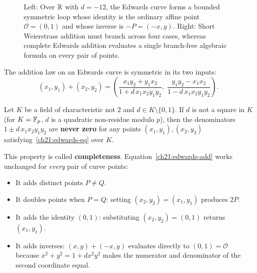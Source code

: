 \begin{figure}[htbp]
\caption{Left: Over $\mathbb{R}$ with $d=-12$, the Edwards curve forms a bounded symmetric loop
whose identity is the ordinary affine point $\mathcal{O}=(0,1)$ and whose inverse is
$-P=(-x,y)$. Right: Short Weierstrass addition must branch across four cases, whereas
complete Edwards addition evaluates a single branch-free algebraic formula on every pair
of points.}
\label{ch21:edwards-fig}
\end{figure}

The addition law on an Edwards curve is symmetric in its two inputs:
\begin{equation}
\label{ch21:edwards-add}
(x_1, y_1) + (x_2, y_2) = \left( \frac{x_1 y_2 + y_1 x_2}{1 + d\,x_1 x_2 y_1 y_2}, \;
\frac{y_1 y_2 - x_1 x_2}{1 - d\,x_1 x_2 y_1 y_2} \right).
\end{equation}

\begin{theorem}
\label{ch21:thm-edwards-complete}
 Let $K$ be a field of characteristic not $2$ and $d \in K \setminus \{0,1\}$. If $d$ is
not a square in $K$ (for $K = \mathbb{F}_p$, $d$ is a quadratic non-residue modulo $p$), then the
denominators $1 \pm d\,x_1 x_2 y_1 y_2$ are \textbf{never zero} for any points
$(x_1, y_1), (x_2, y_2)$ satisfying~\eqref{ch21:edwards-eq} over $K$.
\end{theorem}

This property is called \textbf{completeness}. Equation~\eqref{ch21:edwards-add} works
unchanged for \emph{every} pair of curve points:
\begin{itemize}
  \item It adds distinct points $P \neq Q$.
  \item It doubles points when $P = Q$: setting $(x_2, y_2) = (x_1, y_1)$ produces $2P$.
  \item It adds the identity $(0, 1)$: substituting $(x_2, y_2) = (0, 1)$ returns $(x_1, y_1)$.
  \item It adds inverses: $(x, y) + (-x, y)$ evaluates directly to $(0, 1) = \mathcal{O}$
        because $x^2 + y^2 = 1 + d x^2 y^2$ makes the numerator and denominator of the
        second coordinate equal.
\end{itemize}

